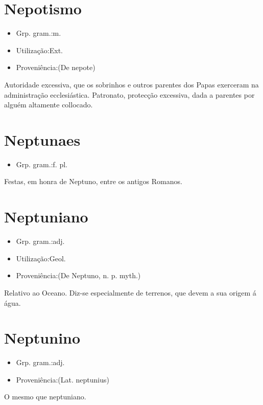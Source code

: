 \section{Nepotismo}
\begin{itemize}
\item {Grp. gram.:m.}
\end{itemize}
\begin{itemize}
\item {Utilização:Ext.}
\end{itemize}
\begin{itemize}
\item {Proveniência:(De \textunderscore nepote\textunderscore )}
\end{itemize}
Autoridade excessiva, que os sobrinhos e outros parentes dos Papas exerceram na administração ecclesiástica.
Patronato, protecção excessiva, dada a parentes por alguém altamente collocado.
\section{Neptunaes}
\begin{itemize}
\item {Grp. gram.:f. pl.}
\end{itemize}
Festas, em honra de Neptuno, entre os antigos Romanos.
\section{Neptuniano}
\begin{itemize}
\item {Grp. gram.:adj.}
\end{itemize}
\begin{itemize}
\item {Utilização:Geol.}
\end{itemize}
\begin{itemize}
\item {Proveniência:(De \textunderscore Neptuno\textunderscore , n. p. myth.)}
\end{itemize}
Relativo ao Oceano.
Diz-se especialmente de terrenos, que devem a sua origem á água.
\section{Neptunino}
\begin{itemize}
\item {Grp. gram.:adj.}
\end{itemize}
\begin{itemize}
\item {Proveniência:(Lat. \textunderscore neptunius\textunderscore )}
\end{itemize}
O mesmo que \textunderscore neptuniano\textunderscore .
